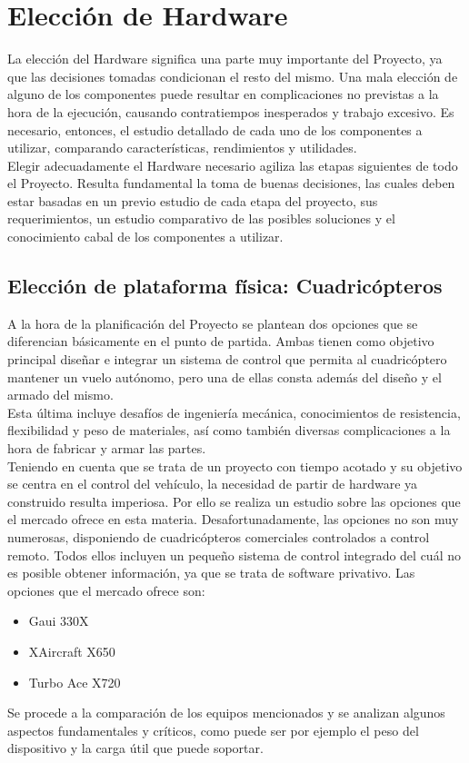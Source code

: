 \documentclass[main]{subfiles}
\begin{document}
\chapter{Elecci\'on de Hardware}
\label{chap:hardware}


La elecci\'on del Hardware significa una parte muy importante del Proyecto, ya que las decisiones tomadas condicionan el resto del mismo. Una mala elecci\'on de alguno de los componentes puede resultar en complicaciones no previstas a la hora de la ejecuci\'on, causando contratiempos inesperados y trabajo excesivo. Es necesario, entonces, el estudio detallado de cada uno de los componentes a utilizar, comparando caracter\'isticas, rendimientos y utilidades. \\
Elegir adecuadamente el Hardware necesario agiliza las etapas siguientes de todo el Proyecto. Resulta fundamental la toma de buenas decisiones, las cuales deben estar basadas en un previo estudio de cada etapa del proyecto, sus requerimientos, un estudio comparativo de las posibles soluciones y el conocimiento cabal de los componentes a utilizar.\\

\section{Elecci\'on de plataforma f\'isica: Cuadric\'opteros}
\vspace*{15pt}

A la hora de la planificaci\'on del Proyecto se plantean dos opciones que se diferencian b\'asicamente en el punto de partida. Ambas tienen como objetivo principal dise\~nar e integrar un sistema de control que permita al cuadric\'optero mantener un vuelo aut\'onomo, pero una de ellas consta adem\'as del dise\~no y el armado del mismo. \\Esta \'ultima incluye desaf\'ios de ingenier\'ia mec\'anica, conocimientos de resistencia, flexibilidad y peso de materiales, as\'i como tambi\'en diversas complicaciones a la hora de fabricar y armar las partes. \\ Teniendo en cuenta que se trata de un proyecto con tiempo acotado y su objetivo se centra en el control del veh\'iculo, la necesidad de partir de hardware ya construido resulta imperiosa. Por ello se realiza un estudio sobre las opciones que el mercado ofrece en esta materia. Desafortunadamente, las opciones no son muy numerosas, disponiendo de cuadric\'opteros comerciales controlados a control remoto. Todos ellos incluyen un peque\~no sistema de control integrado del cu\'al no es posible obtener informaci\'on, ya que se trata de software privativo. Las opciones que el mercado ofrece son: 
\begin{itemize}
	\item Gaui 330X
	\item XAircraft X650
	\item Turbo Ace X720
\end{itemize}
Se procede a la comparaci\'on de los equipos mencionados y se analizan algunos aspectos fundamentales y cr\'iticos, como puede ser por ejemplo el peso del dispositivo y la carga \'util que puede soportar.\\[20pt]
\end{document}
